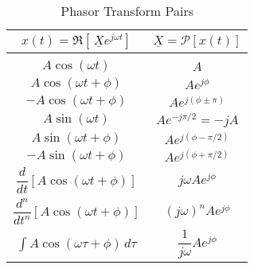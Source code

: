 \documentclass{report}
\begin{document}
\begin{table}[hbt!]
    \centering
    \caption{Phasor Transform Pairs}
    \label{phasor_pairs}
    \begin{tabular}{|c|c|}
        \hline
        $x(t)=\Re[\,\underline{X}e^{j\omega t}]$ & $\underline{X} = \mathcal{P}[x(t)]$ \\[0.15cm]
        \hline
        & \\[0.1cm]
        $A\cos(\omega t)$ & $A$ \\[0.5cm]
        $A\cos(\omega t+\phi)$ & $Ae^{j\phi}$ \\[0.5cm]
        $-A\cos(\omega t+\phi)$ & $Ae^{j(\phi\pm\pi)}$ \\[0.5cm]
        $A\sin(\omega t)$ & $Ae^{-j\pi/2}=-jA$ \\[0.5cm]
        $A\sin(\omega t+\phi)$ & $Ae^{j(\phi-\pi/2)}$ \\[0.5cm]
        $-A\sin(\omega t+\phi)$ & $Ae^{j(\phi+\pi/2)}$ \\[0.5cm]
        $\dfrac{d}{dt}\left[A\cos(\omega t+\phi)\right]$ & $j\omega Ae^{j\phi}$ \\[0.5cm]
        $\dfrac{d^n}{dt^n}\left[A\cos(\omega t+\phi)\right]$ & $(j\omega)^n Ae^{j\phi}$ \\[0.5cm]
        $\displaystyle\int A\cos(\omega \tau+\phi)\,d\tau$ & $\dfrac{1}{j\omega} Ae^{j\phi}$ \\[0.5cm]
        \hline
    \end{tabular}
\end{table}
\end{document}

